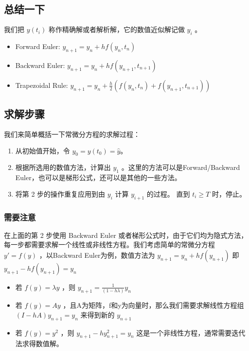 \subsection{总结一下}

我们把 $y(t_i)$ 称作精确解或者解析解，它的数值近似解记做 $y_i$ 。
\begin{itemize}
\item Forward Euler: $y_{n+1}=y_n+hf(y_n,t_n)$ 
\item Backward Euler: $y_{n+1}=y_n+hf(y_{n+1},t_{n+1})$ 
\item Trapezoidal Rule: $y_{n+1}=y_n+\frac{h}{2}\left(f(y_n,t_n)+f(y_{n+1},t_{n+1}) \right)$ 
\end{itemize}


\subsection{求解步骤}

我们来简单概括一下常微分方程的求解过程：

\begin{enumerate}
\item 从初始值开始，令 $y_0=y(t_0)=\hat{y}$。
\item 根据所选用的数值方法，计算出 $y_1$ 。这里的方法可以是Forward/Backward Euler，也可以是梯形公式，还可以是其他的一些方法。
\item 将第 2 步的操作重复应用到由 $y_i$ 计算 $y_{i+1}$ 的过程。 直到 $t_i\ge T$ 时，停止。
\end{enumerate}

\subsubsection{需要注意}

在上面的第 2 步使用 Backward Euler 或者梯形公式时，由于它们均为隐式方法，每一步都需要求解一个线性或非线性方程。我们考虑简单的常微分方程 $y'=f(y)$ ，以Backward Euler为例，数值方法为 $y_{n+1}=y_{n}+hf(y_{n+1})$ 即 $y_{n+1}-hf(y_{n+1})=y_{n}$ 

\begin{itemize}
\item 若 $f(y)=\lambda y$ ，则 $y_{n+1}=\frac{1}{(1-h\lambda)}y_n$ 
\item 若 $f(y)=A y$ ，且A为矩阵，f和y为向量时，那么我们需要求解线性方程组 $(I-hA)y_{n+1}=y_n$ 来得到新的 $y_{n+1}$
\item 若 $f(y)=y^2$ ，则 $y_{n+1}-hy^2_{n+1} = y_n$ 这是一个非线性方程，通常需要迭代法求得数值解。
\end{itemize}

